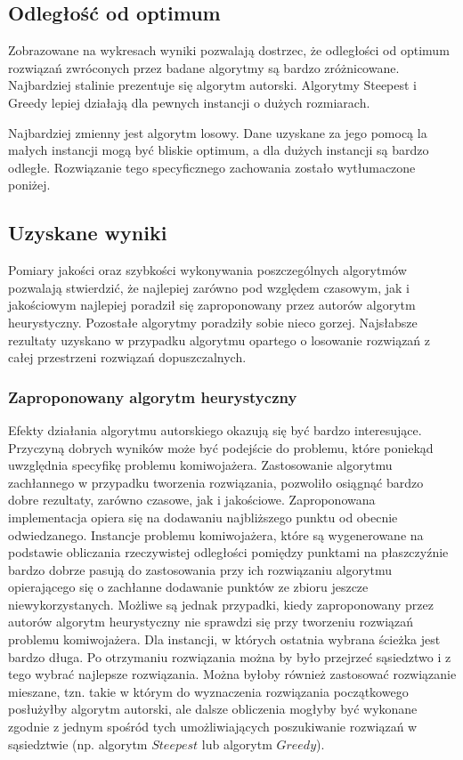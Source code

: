 \subsection{Odległość od optimum}

Zobrazowane na wykresach wyniki pozwalają dostrzec, że odległości od
optimum rozwiązań zwróconych przez badane algorytmy
są bardzo zróżnicowane. Najbardziej stalinie prezentuje się algorytm autorski. Algorytmy Steepest i Greedy lepiej działają dla pewnych instancji
o dużych rozmiarach.

Najbardziej zmienny jest algorytm losowy. Dane uzyskane za jego pomocą 
la małych instancji mogą być bliskie optimum, a dla dużych instancji
są bardzo odległe. Rozwiązanie tego specyficznego zachowania zostało
wytłumaczone poniżej.

\subsection{Uzyskane wyniki}

Pomiary jakości oraz szybkości wykonywania poszczególnych algorytmów
pozwalają stwierdzić, że najlepiej zarówno pod względem czasowym, jak i
jakościowym najlepiej poradził się zaproponowany
przez autorów algorytm heurystyczny. Pozostałe algorytmy poradziły sobie
nieco gorzej. Najsłabsze rezultaty uzyskano w przypadku algorytmu
opartego o losowanie rozwiązań z całej przestrzeni rozwiązań dopuszczalnych.

\subsubsection{Zaproponowany algorytm heurystyczny}

Efekty działania algorytmu autorskiego okazują się być bardzo
interesujące. Przyczyną dobrych wyników może być podejście do problemu,
które poniekąd uwzględnia specyfikę problemu komiwojażera.
Zastosowanie algorytmu zachłannego w przypadku tworzenia rozwiązania,
pozwoliło osiągnąć bardzo dobre rezultaty, zarówno czasowe, jak i
jakościowe. Zaproponowana implementacja opiera się na dodawaniu
najbliższego punktu od obecnie odwiedzanego. Instancje problemu komiwojażera,
które są wygenerowane na podstawie obliczania rzeczywistej odległości
pomiędzy punktami na płaszczyźnie bardzo dobrze pasują do zastosowania
przy ich rozwiązaniu algorytmu opierającego się o zachłanne dodawanie
punktów ze zbioru jeszcze niewykorzystanych.
Możliwe są jednak przypadki, kiedy zaproponowany przez autorów
algorytm heurystyczny nie sprawdzi się przy tworzeniu rozwiązań
problemu komiwojażera. Dla instancji, w których ostatnia wybrana
ścieżka jest bardzo długa. Po otrzymaniu rozwiązania można by było
przejrzeć sąsiedztwo i z tego wybrać najlepsze rozwiązania. Można byłoby
również zastosować rozwiązanie mieszane, tzn. takie w którym do
wyznaczenia rozwiązania początkowego posłużyłby algorytm autorski,
ale dalsze obliczenia mogłyby być wykonane zgodnie z jednym
spośród tych umożliwiających poszukiwanie rozwiązań w sąsiedztwie
(np. algorytm  $Steepest$ lub algorytm $Greedy$).

